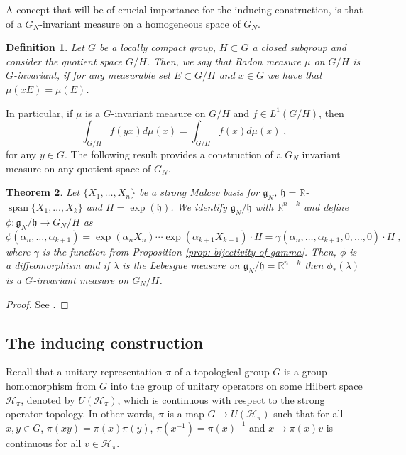\documentclass[pdflatex,sn-mathphys-num]{sn-jnl}
\theoremstyle{thmstyletwo}
\newtheorem{definition}{Definition}[section]
\theoremstyle{thmstyleone}
\newtheorem{theorem}[definition]{Theorem}
\theoremstyle{thmstyletwo}
\newcommand{\fancyh}{\mathfrak{h}}
\newcommand{\fancyg}{\mathfrak{g}}
\newcommand{\R}{\mathbb{R}}
\begin{document}
	A concept that will be of crucial importance for the inducing construction, is that of a $G_N$-invariant measure on a homogeneous space of $G_N$.
	\begin{definition}
		Let $G$ be a locally compact group, $H \subset G$ a closed subgroup and consider the quotient space $G/H$. Then, we say that Radon measure $\mu$ on $G/H$ is $G$-invariant, if for any measurable set $E\subset G/H$ and $x \in G$ we have that $\mu(xE) = \mu(E)$.
	\end{definition}
	In particular, if $\mu$ is a $G$-invariant measure on $G/H$ and $f \in L^1(G/H)$, then 
	\begin{equation*}
		\int_{G/H} f(yx) d\mu(x) = \int_{G/H} f(x) d\mu(x) \;,
	\end{equation*}
	for any $y \in G$. The following result provides a construction of a $G_N$ invariant measure on any quotient space of $G_N$.
	\begin{theorem}\label{thm: construction of G-inv measure}
		Let $\{X_1, \ldots, X_n\}$ be a strong Malcev basis for $\fancyg_N$, $\fancyh = \R$-$\operatorname{span}\{X_1, \ldots, X_k\}$ and $H = \exp(\fancyh)$. We identify $\fancyg_N/\fancyh$ with $\R^{n-k}$ and define $\phi: \fancyg_N/\fancyh \to G_N/H$ as 
		$$\phi(\alpha_n, \ldots, \alpha_{k+1}) = \exp(\alpha_nX_n)\cdots\exp(\alpha_{k+1}X_{k+1}) \cdot H = \gamma(\alpha_n, \ldots, \alpha_{k+1}, 0, \ldots, 0) \cdot H\;,$$
		where $\gamma$ is the function from Proposition \ref{prop: bijectivity of gamma}. Then, $\phi$ is a diffeomorphism and if $\lambda$ is the Lebesgue measure on $\fancyg_N/\fancyh = \R^{n-k}$ then $\phi_*(\lambda)$ is a $G$-invariant measure on $G_N/H$.
	\end{theorem}
	\begin{proof}
		See \cite[Theorem~1.2.12]{corwin1990representations}.
	\end{proof}
	\subsection{The inducing construction}\label{sec: inducing construction}
	Recall that a unitary representation $\pi$ of a topological group $G$ is a group homomorphism from $G$ into the group of unitary operators on some Hilbert space  $\mathcal{H}_{\pi}$, denoted by $U(\mathcal{H}_{\pi})$, which is continuous with respect to the strong operator topology. In other words, $\pi$ is a map $G \to U(\mathcal{H}_{\pi})$ such that for all $x,y \in G$, $\pi(xy) = \pi(x)\pi(y)$, $\pi(x^{-1}) = \pi(x)^{-1}$ and $x \mapsto \pi(x)v$ is continuous for all $v \in \mathcal{H}_{\pi}$. 
\end{document}
